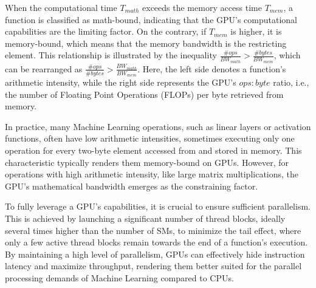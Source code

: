 When the computational time $ T_{math} $ exceeds the memory access time $ T_{mem} $, a function is classified as math-bound, indicating that the GPU's computational capabilities are the limiting factor. On the contrary, if $ T_{mem} $ is higher, it is memory-bound, which means that the memory bandwidth is the restricting element. This relationship is illustrated by the inequality $ \frac{\# ops}{BW_{math}} > \frac{\# bytes}{BW_{mem}} $, which can be rearranged as $ \frac{\# ops}{\# bytes} > \frac{BW_{math}}{BW_{mem}} $. Here, the left side denotes a function's arithmetic intensity, while the right side represents the GPU's $ops:byte$ ratio, i.e., the number of Floating Point Operations (FLOPs) per byte retrieved from memory.

In practice, many Machine Learning operations, such as linear layers or activation functions, often have low arithmetic intensities, sometimes executing only one operation for every two-byte element accessed from and stored in memory. This characteristic typically renders them memory-bound on GPUs. However, for operations with high arithmetic intensity, like large matrix multiplications, the GPU's mathematical bandwidth emerges as the constraining factor.

To fully leverage a GPU's capabilities, it is crucial to ensure sufficient parallelism. This is achieved by launching a significant number of thread blocks, ideally several times higher than the number of SMs, to minimize the tail effect, where only a few active thread blocks remain towards the end of a function's execution. By maintaining a high level of parallelism, GPUs can effectively hide instruction latency and maximize throughput, rendering them better suited for the parallel processing demands of Machine Learning compared to CPUs.